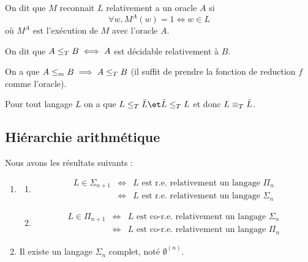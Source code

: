 \begin{definition}[Reconnaissance]

	On dit que $M$ reconnait $L$ relativement a un oracle $A$ si
	$$ \forall w, M^A (w) = 1 \iff w \in L $$
	où $M^A$ est l'exécution de $M$ avec l'oracle $A$.

\end{definition}

\begin{definition}
	On dit que $A \leq_T B \iff A$ est décidable relativement à $B$.
\end{definition}

\begin{remarque}
	On a que $A \leq_m B \implies A \leq_T B$ (il suffit de prendre la fonction de reduction $f$ comme l'oracle).
\end{remarque}

\begin{remarque}
	Pour tout langage $L$ on a que $L \leqt \bar L \et \bar L \leqt L$ et donc $L \equiv_T \bar L$.
\end{remarque}


\subsection{Hiérarchie arithmétique}

\begin{theorem}[de Post]
	Nous avons les résultats suivants :
	\begin{enumerate}
		\item \label{thm:post-1}
		      \begin{enumerate}
			      \item \label{thm:post-1a}
			            \begin{eqnarray*}
				            L \in \Sigma_{n+1} &\iff& L \text{ est r.e. relativement  un langage }  \Pi_n  \\
				            &\iff& L \text{ est r.e. relativement  un langage }  \Sigma_{n}
			            \end{eqnarray*}

			      \item
			            \begin{eqnarray*}
				            L \in \Pi_{n+1} &\iff& L \text{ est co-r.e. relativement  un langage }  \Sigma_n  \\
				            &\iff& L \text{ est co-r.e. relativement  un langage }  \Pi_n
			            \end{eqnarray*}
		      \end{enumerate}

		\item Il existe un langage $\Sigma_n$ complet, noté $\emptyset^{(n)}$. \label{thm:post-2}
	\end{enumerate}
\end{theorem}


